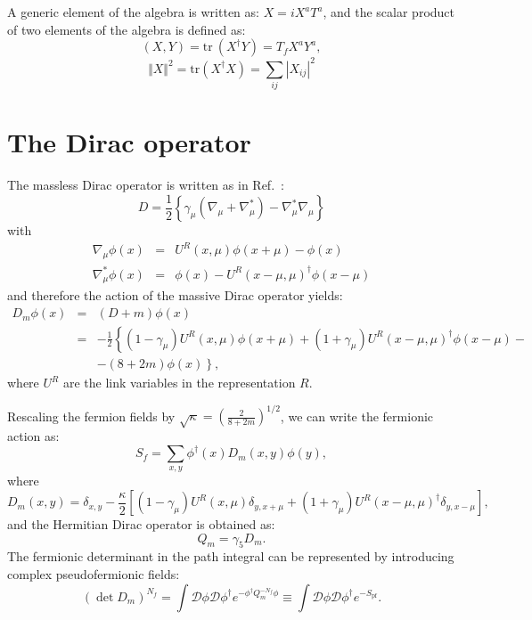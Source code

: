 \documentclass{article}[12pt]
\begin{document}
\noindent
A generic element of the algebra is written as: $X=i X^a T^a$, and the
scalar product of two elements of the algebra is defined as:
%
\begin{equation}
(X,Y)= \mathrm{tr\ } \left(X^\dagger Y\right) = T_f X^a Y^a,
\end{equation}
%
\begin{equation}
\Vert X \Vert^2 = \mathrm{tr } \left(X^\dagger X\right)
 = \sum_{ij} \left| X_{ij} \right|^2
\end{equation}

\section{The Dirac operator}
The massless Dirac operator is written as in Ref.~\cite{Luscher:1996sc}:
%
\begin{equation}
D = \frac12 \left\{\gamma_\mu \left(\nabla_\mu + \nabla^*_\mu \right) 
- \nabla^*_\mu \nabla_\mu \right\}
\end{equation}
%
with
%
\begin{eqnarray}
\nabla_\mu\phi(x) &=& U^R (x,\mu)\phi(x+\mu) - \phi(x) \\
\nabla_\mu^*\phi(x) &=& \phi(x) - U^R (x-\mu,\mu)^\dagger\phi(x-\mu)
\end{eqnarray}
%
and therefore the action of the massive Dirac operator yields:
%
\begin{eqnarray}
D_m \phi(x) &=& (D+m) \phi(x) \nonumber \\
&=& - \frac12 \left\{ \left(1-\gamma_\mu\right) U^R(x,\mu) \phi(x+\mu) +
\left(1+\gamma_\mu\right) U^R(x-\mu,\mu)^\dagger \phi(x-\mu) - \right. 
\nonumber \\
& & \left. -(8+2m) \phi(x) \right\}, \label{DM}
\end{eqnarray}
%
where $U^R$ are the link variables in the representation $R$.

Rescaling the fermion fields by
$\sqrt{\kappa}=\left(\frac{2}{8+2m}\right)^{1/2}$, we can write the
fermionic action as:
%
\begin{equation}
S_f = \sum_{x,y} \phi^\dagger(x) D_m(x,y) \phi(y), 
\end{equation}
%
where
%
\begin{equation}
D_m(x,y) = \delta_{x,y} - \frac{\kappa}{2}
\left[(1-\gamma_\mu) U^R(x,\mu) \delta_{y,x+\mu} + 
(1+\gamma_\mu) U^R(x-\mu,\mu)^\dagger \delta_{y,x-\mu} \right],
\end{equation}
%
and the Hermitian Dirac operator is obtained as:
%
\begin{equation}
Q_m = \gamma_5 D_m. \label{QM}
\end{equation}
The fermionic determinant in the path integral can be represented by
introducing complex pseudofermionic fields:
\begin{equation}
\left(\det D_m\right)^{N_f} = 
\int \mathcal D \phi \mathcal D \phi^\dagger e^{-\phi^\dagger
  Q_m^{-N_f} \phi} \equiv
\int \mathcal D \phi \mathcal D \phi^\dagger e^{-S_\mathrm{pf}}.
\end{equation}
\end{document}
